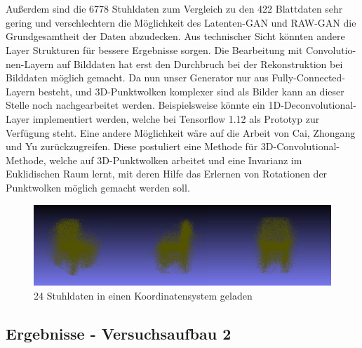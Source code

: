 \documentclass{llncs}
\begin{document}
\\\\ 
Außerdem sind die 6778 Stuhldaten zum Vergleich zu den 422 Blattdaten sehr gering und verschlechtern die Möglichkeit des Latenten-GAN und RAW-GAN die Grundgesamtheit der Daten abzudecken. Aus technischer Sicht könnten andere Layer Strukturen für bessere Ergebnisse sorgen. Die Bearbeitung mit Convolutio-nen-Layern auf Bilddaten hat erst den  Durchbruch bei der Rekonstruktion bei Bilddaten möglich gemacht\cite{imagerecon}. Da nun unser Generator nur aus Fully-Connected-Layern besteht, und 3D-Punktwolken komplexer sind als Bilder kann an dieser Stelle noch nachgearbeitet werden. Beispielsweise könnte ein 1D-Deconvolutional-Layer implementiert werden, welche bei Tensorflow 1.12 als Prototyp zur Verfügung steht. Eine andere Möglichkeit wäre auf die Arbeit von Cai, Zhongang  und Yu \cite{3d-conv} zurückzugreifen. Diese postuliert eine Methode für 3D-Convolutional-Methode, welche auf 3D-Punktwolken arbeitet und eine Invarianz im Euklidischen Raum lernt, mit deren Hilfe das Erlernen von Rotationen der Punktwolken möglich gemacht werden soll.
\begin{figure}[htbp] 
	\centering
	\includegraphics[width=1.0\textwidth]{chair_all.png}
	\caption{24 Stuhldaten in einen Koordinatensystem geladen}
	\label{fig:Bild85}
\end{figure}
\newpage
\subsection{Ergebnisse - Versuchsaufbau 2}
\end{document}
